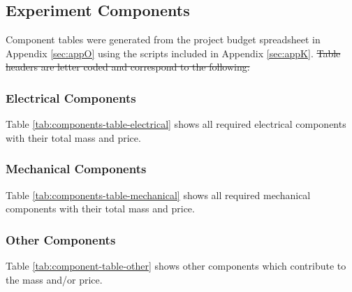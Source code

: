 \documentclass[a4paper,12pt,oneside]{article} %
\providecommand{\DIFdeltex}[1]{{\protect\color{red}\sout{#1}}}                      %
\providecommand{\DIFdelbegin}{} %
\providecommand{\DIFdelend}{} %
\providecommand{\DIFdel}[1]{\texorpdfstring{\DIFdeltex{#1}}{}} %
\newcommand{\DIFscaledelfig}{0.5}
\newlength{\DIFdelgraphicswidth} %
\newlength{\DIFdelgraphicsheight} %
\newcommand{\DIFdelincludegraphics}[2][]{%
\sbox{\DIFdelgraphicsbox}{\DIFOincludegraphics[#1]{#2}}%
\settoboxwidth{\DIFdelgraphicswidth}{\DIFdelgraphicsbox} %
\settoboxtotalheight{\DIFdelgraphicsheight}{\DIFdelgraphicsbox} %
\scalebox{\DIFscaledelfig}{%
\parbox[b]{\DIFdelgraphicswidth}{\usebox{\DIFdelgraphicsbox}\\[-\baselineskip] \rule{\DIFdelgraphicswidth}{0em}}\llap{\resizebox{\DIFdelgraphicswidth}{\DIFdelgraphicsheight}{%
\setlength{\unitlength}{\DIFdelgraphicswidth}%
\begin{picture}(1,1)%
\thicklines\linethickness{2pt} %
{\color[rgb]{1,0,0}\put(0,0){\framebox(1,1){}}}%
{\color[rgb]{1,0,0}\put(0,0){\line( 1,1){1}}}%
{\color[rgb]{1,0,0}\put(0,1){\line(1,-1){1}}}%
\end{picture}%
}\hspace*{3pt}}} %
} %
\DeclareRobustCommand{\DIFdelbegin}{\DIFOdelbegin \let\includegraphics\DIFdelincludegraphics} %
\DeclareRobustCommand{\DIFdelend}{\DIFOaddend \let\includegraphics\DIFOincludegraphics} %
\begin{document}
\raggedbottom
\begin{landscape}
\subsection{Experiment Components} \label{components}
\label{sec:experiment-components}

Component tables were generated from the project budget spreadsheet in Appendix \ref{sec:appO} using the scripts included in Appendix \ref{sec:appK}. 
\DIFdelbegin \DIFdel{Table headers are letter coded and correspond to the following:
}\DIFdelend 

\subsubsection{Electrical Components}

Table \ref{tab:components-table-electrical} shows all required electrical components with their total mass and price.\\



\end{landscape}

\begin{landscape}

\subsubsection{Mechanical Components}

Table \ref{tab:components-table-mechanical} shows all required mechanical components with their total mass and price.\\



\raggedbottom
\end{landscape}

\begin{landscape}
\subsubsection{Other Components}
Table \ref{tab:component-table-other} shows other components which contribute to the mass and/or price.\\



\end{landscape}
\pagebreak
\end{document}
